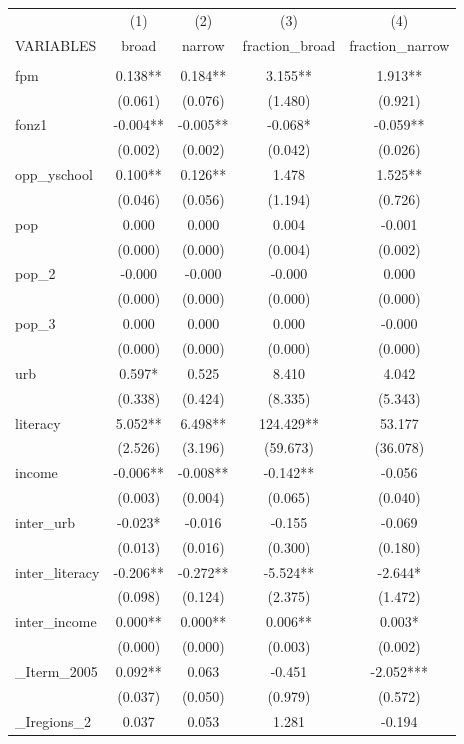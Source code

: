 \documentclass[]{article}
\begin{document}
\begin{tabular}{lcccc} \hline
 & (1) & (2) & (3) & (4) \\
VARIABLES & broad & narrow & fraction\_broad & fraction\_narrow \\ \hline
 &  &  &  &  \\
fpm & 0.138** & 0.184** & 3.155** & 1.913** \\
 & (0.061) & (0.076) & (1.480) & (0.921) \\
fonz1 & -0.004** & -0.005** & -0.068* & -0.059** \\
 & (0.002) & (0.002) & (0.042) & (0.026) \\
opp\_yschool & 0.100** & 0.126** & 1.478 & 1.525** \\
 & (0.046) & (0.056) & (1.194) & (0.726) \\
pop & 0.000 & 0.000 & 0.004 & -0.001 \\
 & (0.000) & (0.000) & (0.004) & (0.002) \\
pop\_2 & -0.000 & -0.000 & -0.000 & 0.000 \\
 & (0.000) & (0.000) & (0.000) & (0.000) \\
pop\_3 & 0.000 & 0.000 & 0.000 & -0.000 \\
 & (0.000) & (0.000) & (0.000) & (0.000) \\
urb & 0.597* & 0.525 & 8.410 & 4.042 \\
 & (0.338) & (0.424) & (8.335) & (5.343) \\
literacy & 5.052** & 6.498** & 124.429** & 53.177 \\
 & (2.526) & (3.196) & (59.673) & (36.078) \\
income & -0.006** & -0.008** & -0.142** & -0.056 \\
 & (0.003) & (0.004) & (0.065) & (0.040) \\
inter\_urb & -0.023* & -0.016 & -0.155 & -0.069 \\
 & (0.013) & (0.016) & (0.300) & (0.180) \\
inter\_literacy & -0.206** & -0.272** & -5.524** & -2.644* \\
 & (0.098) & (0.124) & (2.375) & (1.472) \\
inter\_income & 0.000** & 0.000** & 0.006** & 0.003* \\
 & (0.000) & (0.000) & (0.003) & (0.002) \\
\_Iterm\_2005 & 0.092** & 0.063 & -0.451 & -2.052*** \\
 & (0.037) & (0.050) & (0.979) & (0.572) \\
\_Iregions\_2 & 0.037 & 0.053 & 1.281 & -0.194 \\

\end{tabular}
\end{document}
